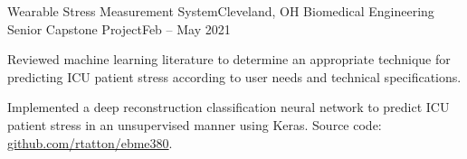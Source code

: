 \begin{ritemize}
{Wearable Stress Measurement System}{Cleveland, OH}
{Biomedical Engineering Senior Capstone Project}{Feb -- May 2021}
	\item Reviewed machine learning literature to determine an appropriate technique for predicting ICU patient stress according to user needs and technical specifications.
	\item Implemented a deep reconstruction classification neural network to predict ICU patient stress in an unsupervised manner using Keras. Source code: \url{github.com/rtatton/ebme380}.
\end{ritemize}